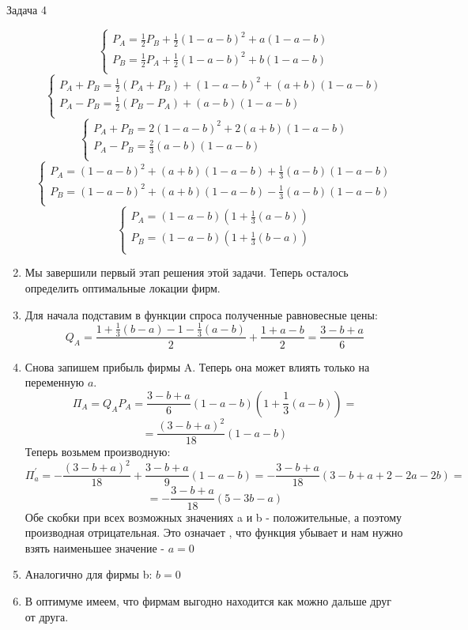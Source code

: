 \begin{mybox}{Задача 4}
\begin{enumerate}
$$\begin{cases}
              P_A=\frac{1}{2}P_B+\frac{1}{2}(1-a-b)^2+a(1-a-b) \\
              P_B=\frac{1}{2}P_A+\frac{1}{2}(1-a-b)^2+b(1-a-b) \\
        \end{cases}$$
        $$\begin{cases}
              P_A+P_B=\frac{1}{2}(P_A+P_B)+(1-a-b)^2+(a+b)(1-a-b) \\
              P_A-P_B=\frac{1}{2}(P_B-P_A)+(a-b)(1-a-b) \\
        \end{cases}$$
        $$\begin{cases}
              P_A+P_B=2(1-a-b)^2+2(a+b)(1-a-b) \\
              P_A-P_B=\frac{2}{3}(a-b)(1-a-b) \\
        \end{cases}$$
        $$\begin{cases}
              P_A=(1-a-b)^2+(a+b)(1-a-b)+\frac{1}{3}(a-b)(1-a-b) \\
              P_B=(1-a-b)^2+(a+b)(1-a-b)-\frac{1}{3}(a-b)(1-a-b) \\
        \end{cases}$$
        $$\begin{cases}
              P_A=(1-a-b)(1+\frac{1}{3}(a-b)) \\
              P_B=(1-a-b)(1+\frac{1}{3}(b-a)) \\
        \end{cases}$$
        \item Мы завершили первый этап решения этой задачи. Теперь осталось определить оптимальные локации фирм.
        \item Для начала подставим в функции спроса полученные равновесные цены:
        $$Q_A=\frac{1+\frac{1}{3}(b-a)-1-\frac{1}{3}(a-b)}{2}+\frac{1+a-b}{2}=\frac{3-b+a}{6}$$
        \item Снова запишем прибыль фирмы A. Теперь она может влиять только на переменную $a$.
        $$\Pi_A=Q_AP_A=\frac{3-b+a}{6}(1-a-b)(1+\frac{1}{3}(a-b))=$$
        $$=\frac{(3-b+a)^2}{18}(1-a-b)$$
        Теперь возьмем производную:
        $$\Pi_a^{'}=-\frac{(3-b+a)^2}{18}+\frac{3-b+a}{9}(1-a-b)=-\frac{3-b+a}{18}(3-b+a+2-2a-2b)=$$
        $$=-\frac{3-b+a}{18}(5-3b-a)$$
        Обе скобки при всех возможных значениях a и b - положительные, а поэтому производная отрицательная. Это означает
        , что функция убывает и нам нужно взять наименьшее значение - $a=0$
        \item Аналогично для фирмы b: $b=0$
        \item В оптимуме имеем, что фирмам выгодно находится как можно дальше друг от друга.
    \end{enumerate}
\end{mybox}

